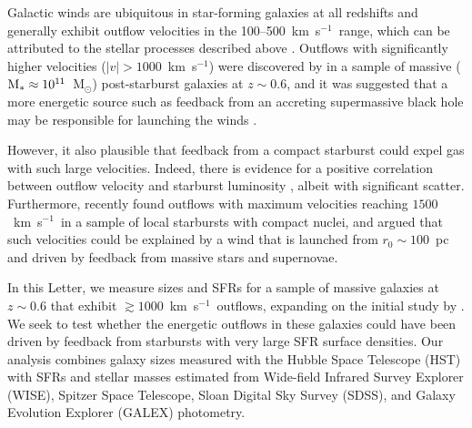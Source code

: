\documentclass[apj]{emulateapj}
\newcommand{\kms}{km~s$^{-1}$}
\newcommand{\msun}{M$_{\odot}$}
\newcommand{\mstar}{M$_{*}$}
\newcommand{\sigmasfr}{\Sigma_{\textnormal{\scriptsize{SFR}}}}
\begin{document}
Galactic winds are ubiquitous in star-forming galaxies at all
redshifts and generally exhibit outflow velocities in the
100--500~\kms\ range, which can be attributed to the stellar processes
described above \citep{hec00,sha03,mar05,rup05,wei09,rub10}.  Outflows
with significantly higher velocities ($|v|>1000$~\kms) were discovered
by \citet{tre07} in a sample of massive
($\textnormal{\mstar}\approx10^{11}$~\msun) post-starburst galaxies at
$z\sim0.6$, and it was suggested that a more energetic source such as
feedback from an accreting supermassive black hole \citep{sil98,dim05}
may be responsible for launching the winds \citep[see][for a recent
  review]{fab12}.

However, it also plausible that feedback from a compact starburst
could expel gas with such large velocities.  Indeed, there is evidence
for a positive correlation between outflow velocity and starburst
luminosity \citep{mar05,rup05,tre07}, albeit with significant scatter.
Furthermore, \citet{hec11} recently found outflows with maximum
velocities reaching $1500$~\kms\ in a sample of local starbursts with
compact nuclei, and argued that such velocities could be explained by
a wind that is launched from $r_0\sim100$~pc and driven by feedback
from massive stars and supernovae.


In this Letter, we measure sizes and SFRs for a sample of massive
galaxies at $z\sim0.6$ that exhibit $\gtrsim1000$~\kms\ outflows,
expanding on the initial study by \citet{tre07}.  We seek to test
whether the energetic outflows in these galaxies could have been
driven by feedback from starbursts with very large SFR surface
densities.  Our analysis combines galaxy sizes measured with the
Hubble Space Telescope (HST) with SFRs and stellar masses estimated
from Wide-field Infrared Survey Explorer (WISE), Spitzer Space
Telescope, Sloan Digital Sky Survey (SDSS), and Galaxy Evolution
Explorer (GALEX) photometry.

\end{document}
